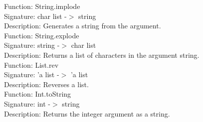 \documentclass{article}
\begin{document}
\noindent Function: String.implode\\
Signature: char list -$>$ string\\
Description: Generates a string from the argument.\\

\noindent Function: String.explode\\
Signature: string -$>$ char list\\
Description: Returns a list of characters in the argument string.\\

\noindent Function: List.rev\\
Signature: 'a list -$>$ 'a list\\
Description: Reverses a list.\\

\noindent Function: Int.toString\\
Signature: int -$>$ string\\
Description: Returns the integer argument as a string.\\
\end{document}
